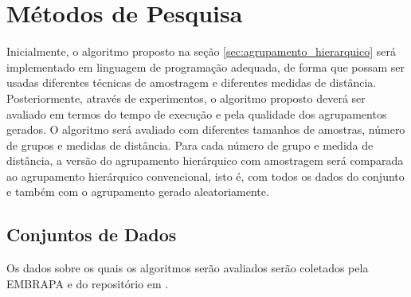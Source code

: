 \section{Métodos de Pesquisa}
	\label{sec:metodologia}
	
Inicialmente, o algoritmo proposto na seção \ref{sec:agrupamento_hierarquico}
será implementado em linguagem de programação adequada, de forma que possam
ser usadas diferentes técnicas de amostragem e diferentes medidas de distância.
Posteriormente, através de experimentos, o algoritmo proposto deverá ser 
avaliado em termos do tempo de execução e pela qualidade dos agrupamentos 
gerados. O algoritmo será avaliado com diferentes tamanhos de amostras, número
de grupos e medidas de distância. Para cada número de grupo e medida de
distância, a versão do agrupamento hierárquico com amostragem será comparada
ao agrupamento hierárquico convencional, isto é, com todos os dados do conjunto
e também com o agrupamento gerado aleatoriamente.

\subsection{Conjuntos de Dados}

Os dados sobre os quais os algoritmos serão avaliados serão coletados pela 
EMBRAPA e do repositório em \cite{global2016}.